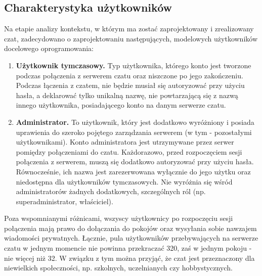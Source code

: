 \subsection{Charakterystyka użytkowników}

Na etapie analizy kontekstu, w którym ma zostać zaprojektowany i zrealizowany czat, zadecydowano o zaprojektowaniu następujących,
modelowych użytkowników docelowego oprogramowania:

\begin{enumerate}

	\item \textbf{Użytkownik tymczasowy.} Typ użytkownika, którego konto jest tworzone podczas połączenia z serwerem czatu oraz
		niszczone po jego zakończeniu. Podczas łączenia z czatem, nie będzie musiał się autoryzować przy użyciu hasła, a deklarować
		tylko unikalną nazwę, nie powtarzającą się z nazwą innego użytkownika, posiadającego konto na danym serwerze czatu.

	\item \textbf{Administrator.} To użytkownik, który jest dodatkowo wyróżniony i posiada uprawienia do szeroko pojętego
		zarządzania serwerem (w tym - pozostałymi użytkownikami). Konto administratora jest utrzymywane przez serwer pomiędzy połączeniami do czatu. Każdorazowo, przed rozpoczęciem sesji połączenia z serwerem, muszą się dodatkowo autoryzować przy użyciu hasła. Równocześnie, ich nazwa jest zarezerwowana wyłącznie do jego użytku oraz niedostępna
		dla użytkowników tymczasowych. Nie wyróżnia się wśród administratorów żadnych dodatkowych, szczególnych
		ról (np. superadministrator, właściciel).

\end{enumerate}

Poza wspomnianymi różnicami, wszyscy użytkownicy po rozpoczęciu sesji połączenia mają prawo do dołączania do pokojów oraz wysyłania sobie
nawzajem wiadomości prywatnych. Łącznie, pula użytkowników przebywających na serwerze czatu w jednym momencie nie powinna przekraczać 320,
zaś w jednym pokoju - nie więcej niż 32. W związku z tym można przyjąć, że czat jest przeznaczony dla niewielkich społeczności, np.
szkolnych, uczelnianych czy hobbystycznych.

